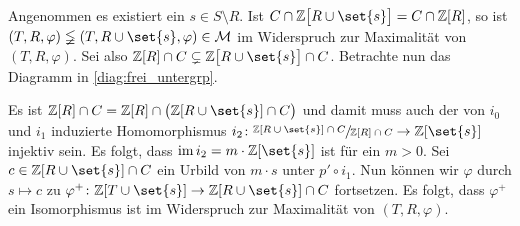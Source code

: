 \begin{beweis}
	Angenommen es existiert ein $s \in S \setminus R$.
	Ist $C \cap \mathbb{Z} \benbrace[\big]{R \cup \set{s}} = C \cap \mathbb{Z}[R]$, so ist $(T,R,\varphi) \lneqq (T,R \cup \set{s},\varphi) \in \mathcal{M}$ im Widerspruch zur Maximalität von $(T,R,\varphi)$. 
	Sei also $\mathbb{Z}[R] \cap C \subsetneq \mathbb{Z}\benbrace[\big]{R \cup \set{s}} \cap C$. 
	Betrachte nun das Diagramm in \cref{diag:frei_untergrp}.
	\begin{figure}[t]
	\end{figure}
	Es ist $\mathbb{Z}[R] \cap C  = \mathbb{Z}[R] \cap \enbrace[\big]{\mathbb{Z}[R \cup \set{s}] \cap C}$ und damit muss auch der von $i_0$ und $i_1$ induzierte Homomorphismus $i_2 \colon \sfrac{\mathbb{Z}[R \cup \set{s}] \cap C}{\mathbb{Z}[R] \cap C} \to \mathbb{Z}[\set{s}]$ injektiv sein. 
	Es folgt, dass $\im i_2 = m \cdot \mathbb{Z}\benbrace*{\set{s}}$ ist für ein $m >0$. 
	Sei $c \in \mathbb{Z}[R \cup \set{s}] \cap C$ ein Urbild von $m \cdot s$ unter $p' \circ i_1$. 
	Nun können wir $\varphi$ durch $s \mapsto c$ zu $\varphi^+ \colon \mathbb{Z}\benbrace*{T \cup\set{s}} \to \mathbb{Z}\benbrace*{R \cup \set{s}}\cap C$ fortsetzen. 
	Es folgt, dass $\varphi^+$ ein Isomorphismus ist im Widerspruch zur Maximalität von $(T,R,\varphi)$.
\end{beweis}

